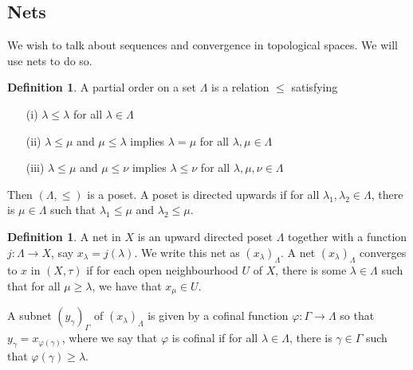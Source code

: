 \documentclass[11pt]{amsart}
\theoremstyle{definition}
\newtheorem{definition}[theorem]{Definition}
\numberwithin{equation}{section}
\begin{document}
\subsection{Nets}
We wish to talk about sequences and convergence in topological spaces. We will use nets to do so.
\begin{definition}
    A partial order on a set $\Lambda$ is a relation $\le$ satisfying
    \begin{enumerate}
        \item [(i)] $\lambda\le \lambda$ for all $\lambda\in\Lambda$
        \item [(ii)] $\lambda\le \mu$ and $\mu\le\lambda$ implies $\lambda=\mu$ for all $\lambda,\mu\in\Lambda$
        \item [(iii)] $\lambda\le \mu$ and $\mu\le \nu$ implies $\lambda\le \nu$ for all $\lambda,\mu,\nu\in\Lambda$
    \end{enumerate}
    Then $(\Lambda,\le)$ is a poset. A poset is directed upwards if for all $\lambda_1,\lambda_2\in\Lambda$, there is $\mu\in\Lambda$ such that $\lambda_1\le \mu$ and $\lambda_2\le \mu$.
\end{definition}
\begin{definition}
    A net in $X$ is an upward directed poset $\Lambda$ together with a function $j:\Lambda\to X$, say $x_\lambda=j(\lambda)$. We write this net as $(x_\lambda)_\Lambda$. A net $(x_\lambda)_\Lambda$ converges to $x$ in $(X,\tau)$ if for each open neighbourhood $U$ of $X$, there is some $\lambda\in \Lambda$ such that for all $\mu\ge \lambda$, we have that $x_\mu\in U$.

    A subnet $(y_\gamma)_\Gamma$ of $(x_\lambda)_\Lambda$ is given by a cofinal function $\varphi:\Gamma\to\Lambda$ so that $y_\gamma=x_{\varphi(\gamma)}$, where we say that $\varphi$ is cofinal if for all $\lambda\in\Lambda$, there is $\gamma\in\Gamma$ such that $\varphi(\gamma)\ge \lambda$.
\end{definition}
\end{document}
